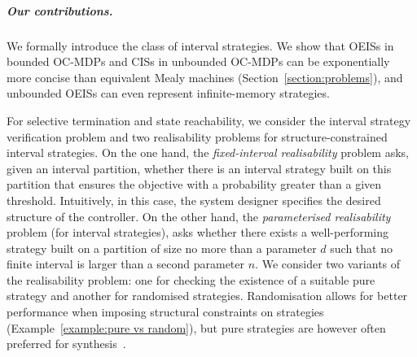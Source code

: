 \documentclass[a4paper,UKenglish,cleveref,autoref,thm-restate,colorlinks]{lipics-v2021}
\newcommand{\intNum}{d}
\newcommand{\intSize}{n}
\begin{document}
\subparagraph*{Our contributions.}
We formally introduce the class of interval strategies. We show that
OEISs in bounded OC-MDPs and CISs in unbounded OC-MDPs can be exponentially more concise than equivalent Mealy machines (Section~\ref{section:problems}), and unbounded OEISs can even represent infinite-memory strategies.


For selective termination and state reachability, we consider the interval strategy verification problem and two realisability problems for structure-constrained interval strategies.
On the one hand, the \textit{fixed-interval realisability} problem asks, given an interval partition, whether there is an interval strategy built on this partition that ensures the objective with a probability greater than a given threshold.
Intuitively, in this case, the system designer specifies the desired structure of the controller.
On the other hand, the \textit{parameterised realisability} problem (for interval strategies), asks whether there exists a well-performing strategy built on a partition of size no more than a parameter $\intNum$ such that no finite interval is larger than a second parameter $\intSize$.
We consider two variants of the realisability problem: one for checking the existence of a suitable pure strategy and another for randomised strategies.
Randomisation allows for better performance when imposing structural constraints on strategies (Example~\ref{example:pure vs random}), but pure strategies are however often preferred for synthesis~\cite{DBLP:conf/tacas/DelgrangeKQR20}.
\end{document}
